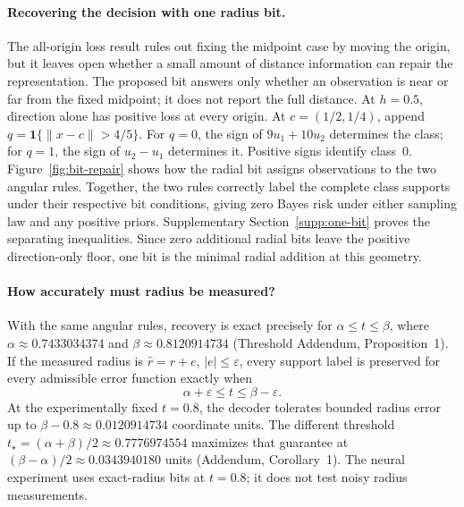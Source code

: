 \paragraph{Recovering the decision with one radius bit.}
The all-origin loss result rules out fixing the midpoint case by moving the origin, but it leaves open whether a small amount of distance information can repair the representation. The proposed bit answers only whether an observation is near or far from the fixed midpoint; it does not report the full distance. At $h=0.5$, direction alone has positive loss at every origin. At $c=(1/2,1/4)$, append $q=\mathbf1\{\|x-c\|>4/5\}$. For $q=0$, the sign of $9u_1+10u_2$ determines the class; for $q=1$, the sign of $u_2-u_1$ determines it. Positive signs identify class~0. Figure~\ref{fig:bit-repair} shows how the radial bit assigns observations to the two angular rules. Together, the two rules correctly label the complete class supports under their respective bit conditions, giving zero Bayes risk under either sampling law and any positive priors. Supplementary Section~\ref{supp:one-bit} proves the separating inequalities. Since zero additional radial bits leave the positive direction-only floor, one bit is the minimal radial addition at this geometry.

\paragraph{How accurately must radius be measured?}
With the same angular rules, recovery is exact precisely for $\alpha\leq t\leq\beta$, where $\alpha\approx0.7433034374$ and $\beta\approx0.8120914734$ (Threshold Addendum, Proposition~1). If the measured radius is $\widehat r=r+e$, $|e|\leq\varepsilon$, every support label is preserved for every admissible error function exactly when
\begin{equation}
\alpha+\varepsilon\leq t\leq\beta-\varepsilon.
\label{eq:radius-error}
\end{equation}
At the experimentally fixed $t=0.8$, the decoder tolerates bounded radius error up to $\beta-0.8\approx0.0120914734$ coordinate units. The different threshold $t_\star=(\alpha+\beta)/2\approx0.7776974554$ maximizes that guarantee at $(\beta-\alpha)/2\approx0.0343940180$ units (Addendum, Corollary~1). The neural experiment uses exact-radius bits at $t=0.8$; it does not test noisy radius measurements.
